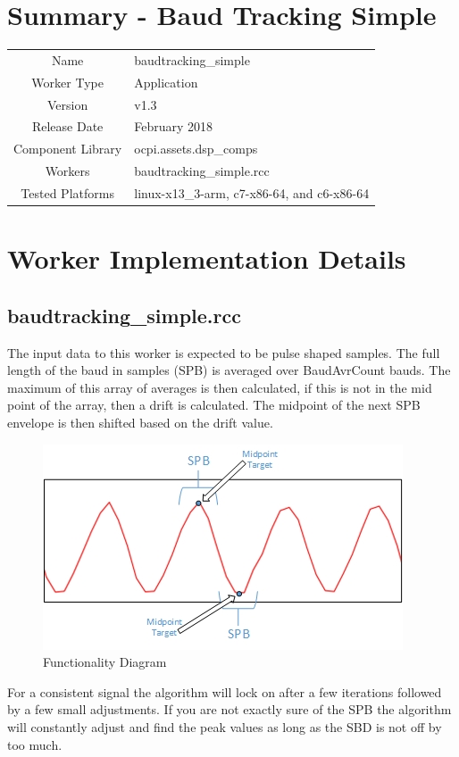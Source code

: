 \documentclass{article}
\author{} %
\date{Version \docVersion} %
\title{\docTitle}
\def\docVersion{1.3}
\def\comp{baudtracking\_simple}
\def\Comp{Baud Tracking Simple}
\begin{document}
\section*{Summary - \Comp}
\begin{tabular}{|c|M{13.5cm}|}
	\hline
	                  &                                          \\
	\hline
	Name              & \comp                                    \\
	\hline
	Worker Type       & Application                              \\
	\hline
	Version           & v\docVersion \\
	\hline
	Release Date      & February 2018 \\
	\hline
	Component Library & ocpi.assets.dsp\_comps                    \\
	\hline
	Workers           & \comp.rcc                                \\
	\hline
	Tested Platforms  & linux-x13\_3-arm, c7-x86-64, and c6-x86-64 \\
	\hline
\end{tabular}
\section*{Worker Implementation Details}
\subsection*{\comp.rcc}
\begin{flushleft}
	The input data to this worker is expected to be pulse shaped samples.  The full length of the baud in samples (SPB) is averaged over BaudAvrCount bauds.  The maximum of this array of averages is then calculated, if this is not in the mid point of the array, then a drift is calculated.  The midpoint of the next SPB envelope is then shifted based on the drift value.\par\medskip

	\begin{figure}[h]
		\centering
		\includegraphics[scale=.75]{baudtracker_signal}
		\caption{Functionality Diagram}
		\label{fig:sig}
	\end{figure}

	For a consistent signal the algorithm will lock on after a few iterations followed by a few small adjustments. If you are not exactly sure of the SPB the algorithm will constantly adjust and find the peak values as long as the SBD is not off by too much.
\end{flushleft}
\end{document}
